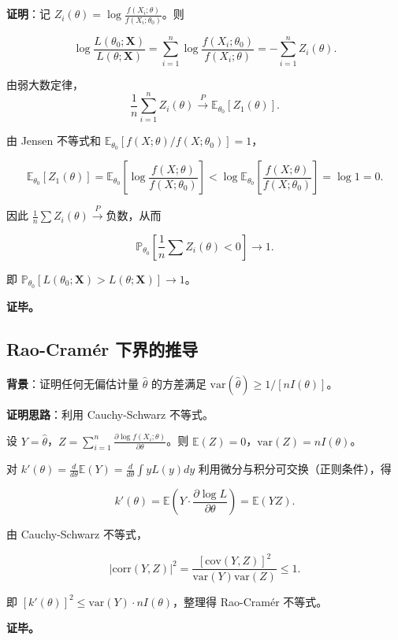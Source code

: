 \textbf{证明}：记 $Z_i(\theta) = \log\frac{f(X_i;\theta)}{f(X_i;\theta_0)}$。则

\[
\log \frac{L(\theta_0; \mathbf{X})}{L(\theta; \mathbf{X})} = \sum_{i=1}^n \log\frac{f(X_i;\theta_0)}{f(X_i;\theta)} = -\sum_{i=1}^n Z_i(\theta).
\]

由弱大数定律，
\[
\frac{1}{n}\sum_{i=1}^n Z_i(\theta) \xrightarrow{P} \mathbb{E}_{\theta_0}[Z_1(\theta)].
\]

由 Jensen 不等式和 $\mathbb{E}_{\theta_0}[f(X;\theta)/f(X;\theta_0)] = 1$，

\[
\mathbb{E}_{\theta_0}[Z_1(\theta)] = \mathbb{E}_{\theta_0}\left[\log\frac{f(X;\theta)}{f(X;\theta_0)}\right] < \log\mathbb{E}_{\theta_0}\left[\frac{f(X;\theta)}{f(X;\theta_0)}\right] = \log 1 = 0.
\]

因此 $\frac{1}{n}\sum Z_i(\theta) \xrightarrow{P} \text{负数}$，从而

\[
\mathbb{P}_{\theta_0}\left[ \frac{1}{n}\sum Z_i(\theta) < 0 \right] \to 1.
\]

即 $\mathbb{P}_{\theta_0}[L(\theta_0; \mathbf{X}) > L(\theta; \mathbf{X})] \to 1$。

\textbf{证毕。}

\subsection{Rao-Cramér 下界的推导}\label{sec:rao-cramer-proof}

\textbf{背景}：证明任何无偏估计量 $\widehat{\theta}$ 的方差满足 $\text{var}(\widehat{\theta}) \geq 1/[nI(\theta)]$。

\textbf{证明思路}：利用 Cauchy-Schwarz 不等式。

设 $Y = \widehat{\theta}$，$Z = \sum_{i=1}^n \frac{\partial \log f(X_i;\theta)}{\partial \theta}$。则 $\mathbb{E}(Z) = 0$，$\text{var}(Z) = nI(\theta)$。

对 $k'(\theta) = \frac{d}{d\theta}\mathbb{E}(Y) = \frac{d}{d\theta}\int yL(y)dy$ 利用微分与积分可交换（正则条件），得

\[
k'(\theta) = \mathbb{E}\left( Y \cdot \frac{\partial \log L}{\partial \theta} \right) = \mathbb{E}(YZ).
\]

由 Cauchy-Schwarz 不等式，

\[
|\text{corr}(Y,Z)|^2 = \frac{[\text{cov}(Y,Z)]^2}{\text{var}(Y)\text{var}(Z)} \leq 1.
\]

即 $[k'(\theta)]^2 \leq \text{var}(Y) \cdot nI(\theta)$，整理得 Rao-Cramér 不等式。

\textbf{证毕。}


